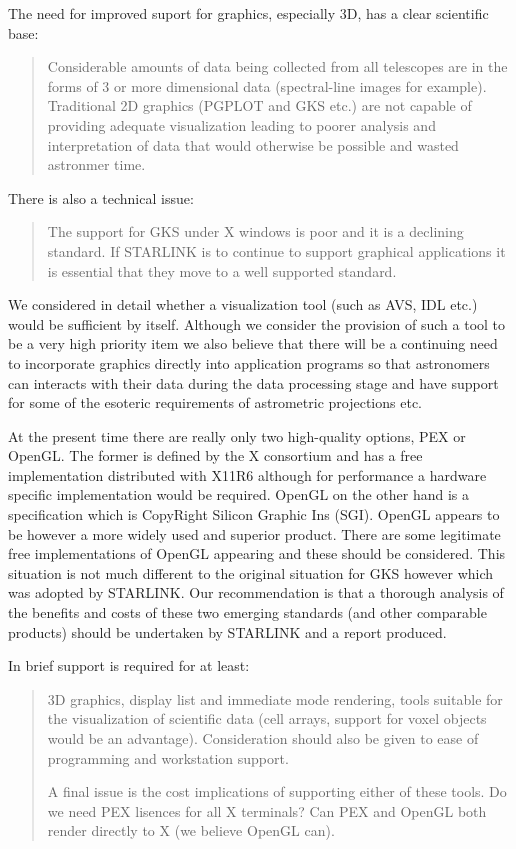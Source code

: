 The need for improved suport for graphics, especially 3D, has a clear
scientific base:

\begin{quote}
Considerable amounts of data being collected from all telescopes are
in the forms of 3 or more dimensional data (spectral-line images for
example).  Traditional 2D graphics (PGPLOT and GKS etc.)  are not
capable of providing adequate visualization leading to poorer analysis
and interpretation of data that would otherwise be possible and wasted
astronmer time.
\end{quote}

There is also a technical issue:

\begin{quote}
The support for GKS under X windows is poor and it is a declining
standard.  If STARLINK is to continue to support graphical
applications it is essential that they move to a well supported
standard.
\end{quote}

We considered in detail whether a visualization tool (such as AVS, IDL
etc.) would be sufficient by itself.  Although we consider the
provision of such a tool to be a very high priority item we also
believe that there will be a continuing need to incorporate graphics
directly into application programs so that astronomers can interacts
with their data during the data processing stage and have support for
some of the esoteric requirements of astrometric projections etc.

At the present time there are really only two high-quality options,
PEX or OpenGL.  The former is defined by the X consortium and has a
free implementation distributed with X11R6 although for performance a
hardware specific implementation would be required.  OpenGL on the
other hand is a specification which is CopyRight Silicon Graphic Ins
(SGI).  OpenGL appears to be however a more widely used and superior
product.  There are some legitimate free implementations of OpenGL
appearing and these should be considered.  This situation is not much
different to the original situation for GKS however which was adopted
by STARLINK.  Our recommendation is that a thorough analysis of the
benefits and costs of these two emerging standards (and other
comparable products) should be undertaken by STARLINK and a report
produced.

In brief support is required for at least:

\begin{quote}
3D graphics, display list and immediate mode rendering, tools
suitable for the visualization of scientific data (cell arrays,
support for voxel objects would be an advantage).  Consideration
should also be given to ease of programming and workstation support.

A final issue is the cost implications of supporting either of these
tools.  Do we need PEX lisences for all X terminals?  Can PEX and
OpenGL both render directly to X (we believe OpenGL can).
\end{quote}

